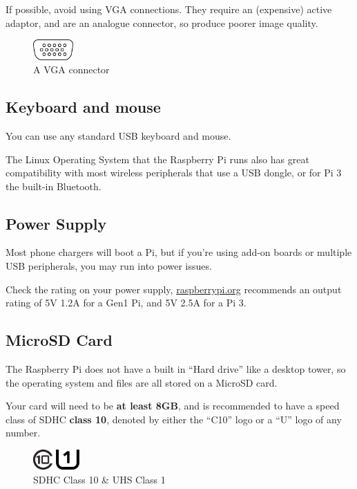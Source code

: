 		If possible, avoid using VGA connections. They require an (expensive) active adaptor, and are an analogue connector, so produce poorer image quality.
		
		\begin{figure}[h]
			\centering
			\includegraphics[height=22pt]{McrRaspJam/000_IntroToPi/1_EquipmentNeeded/VGA}
			\\A VGA connector
		\end{figure}

	\subsection*{Keyboard and mouse}
	
		You can use any standard USB keyboard and mouse.
		
		The Linux Operating System that the Raspberry Pi runs also has great compatibility with most wireless peripherals that use a USB dongle, or for Pi 3 the built-in Bluetooth.
		
	\subsection*{Power Supply}
	
		Most phone chargers will boot a Pi, but if you're using add-on boards or multiple USB peripherals, you may run into power issues.
		
		Check the rating on your power supply, \url{raspberrypi.org} recommends an output rating of 5V 1.2A for a Gen1 Pi, and 5V 2.5A for a Pi 3.
		
	\subsection*{MicroSD Card}
	
		The Raspberry Pi does not have a built in ``Hard drive'' like a desktop tower, so the operating system and files are all stored on a MicroSD card.
		
		Your card will need to be \textbf{at least 8GB}, and is recommended to have a speed class of SDHC \textbf{class 10}, denoted by either the ``C10'' logo or a ``U'' logo of any number.
	
		\begin{figure}[h]
			\centering
			\includegraphics[height=22pt]{McrRaspJam/000_IntroToPi/1_EquipmentNeeded/SDclass10}
			\hspace{12pt}
			\includegraphics[height=22pt]{McrRaspJam/000_IntroToPi/1_EquipmentNeeded/UHSclass}
			\\SDHC Class 10 \& UHS Class 1
		\end{figure}